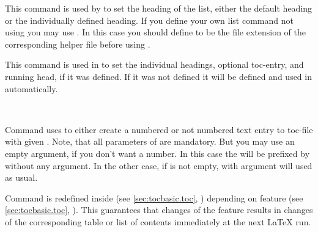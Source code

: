 \begin{Declaration}
\end{Declaration}
%
This command
is used by  to set the heading of the list, either the
default heading or the individually defined heading. If you define your own
list command not using  you may use
. In this case you should define
 to be the file
extension of the corresponding helper file before using
.
%

\begin{Declaration}
\end{Declaration}
%
This command
is used in  to set the individual headings, optional
toc-entry, and running head, if it was defined. If it was not defined it will
be defined and used in  automatically.
%

\begin{Declaration}
  \\
\end{Declaration}
%
%
Command 
uses  to either create a numbered or not numbered text
entry to toc-file with given . Note, that all parameters of
 are mandatory. But you may use an
empty  argument, if you don't want a number. In this case the
 will be prefixed by  without any argument. In
the other case, if  is not empty,  with
argument  will used as usual.

Command  is redefined inside  (see
\autoref{sec:tocbasic.toc}, )
depending on feature  (see
\autoref{sec:tocbasic.toc}, ). This
guarantees that changes of the feature results in changes of the corresponding
table or list of contents immediately at the next \LaTeX{} run.%
%
%

